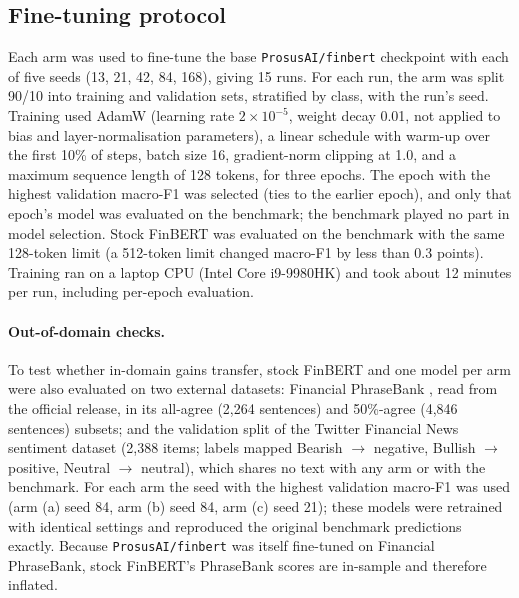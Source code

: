 \documentclass{aims}
\numberwithin{equation}{section}
\begin{document}
\subsection{Fine-tuning protocol}\label{sec:ftmethod}
Each arm was used to fine-tune the base \texttt{ProsusAI/finbert} checkpoint with
each of five seeds (13, 21, 42, 84, 168), giving 15 runs. For each run, the arm was
split 90/10 into training and validation sets, stratified by class, with the run's
seed. Training used AdamW (learning rate $2\times10^{-5}$, weight decay 0.01, not
applied to bias and layer-normalisation parameters), a linear schedule with
warm-up over the first 10\% of steps, batch size 16, gradient-norm clipping at 1.0,
and a maximum sequence length of 128 tokens, for three epochs. The epoch with the
highest validation macro-F1 was selected (ties to the earlier epoch), and only that
epoch's model was evaluated on the benchmark; the benchmark played no part in model
selection. Stock FinBERT was evaluated on the benchmark with the same 128-token limit
(a 512-token limit changed macro-F1 by less than 0.3 points). Training ran on a
laptop CPU (Intel Core i9-9980HK) and took about 12 minutes per run, including
per-epoch evaluation.

\paragraph{Out-of-domain checks.} To test whether in-domain gains transfer, stock
FinBERT and one model per arm were also evaluated on two external datasets:
Financial PhraseBank \citep{malo2014}, read from the official release, in its
all-agree (2{,}264 sentences) and 50\%-agree (4{,}846 sentences) subsets; and the
validation split of the Twitter Financial News sentiment dataset (2{,}388 items;
labels mapped Bearish $\to$ negative, Bullish $\to$ positive, Neutral $\to$
neutral), which shares no text with any arm or with the benchmark. For each arm the
seed with the highest validation macro-F1 was used (arm (a) seed 84, arm (b) seed
84, arm (c) seed 21); these models were retrained with identical settings and
reproduced the original benchmark predictions exactly. Because
\texttt{ProsusAI/finbert} was itself fine-tuned on Financial PhraseBank, stock
FinBERT's PhraseBank scores are in-sample and therefore inflated.
\end{document}
